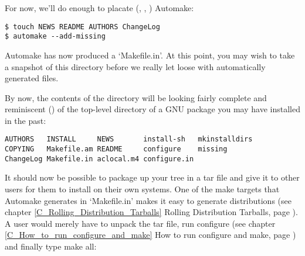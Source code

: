 For now, we'll do enough to placate ({\MfQ{}}, {\MaQ{}}, {\MfQ{}}) Automake: 

\begin{Verbatim}[frame=single]
$ touch NEWS README AUTHORS ChangeLog
$ automake --add-missing
\end{Verbatim}


 Automake has now produced a `Makefile.in'. At this point, you may wish to take a snapshot of this directory before we really let loose with automatically generated files. 


By now, the contents of the directory will be looking fairly complete and
reminiscent ({\MeQ{}}) of the top-level directory of a GNU package you may have installed in the past:

\begin{Verbatim}[frame=single]
AUTHORS   INSTALL     NEWS       install-sh   mkinstalldirs
COPYING   Makefile.am README     configure    missing 
ChangeLog Makefile.in aclocal.m4 configure.in
\end{Verbatim}



 It should now be possible to package up your tree in a tar file and give it to other users for them to install on their own systems. One of the make targets that Automake generates in `Makefile.in' makes it easy to generate distributions (see chapter \ref{C_Rolling_Distribution_Tarballs}
Rolling Distribution Tarballs, page \pageref{C_Rolling_Distribution_Tarballs}).
A user would merely have to unpack the tar file, run configure
(see chapter \ref{C_How_to_run_configure_and_make}
How to run configure and make, page \pageref{C_How_to_run_configure_and_make})
and finally type make all: 


